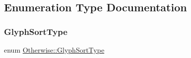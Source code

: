 \subsection{Enumeration Type Documentation}
\mbox{\label{namespace_otherwise_aa27b94bf7fe0e95dd17ed0a3506b12ee}} 
\subsubsection{\texorpdfstring{Glyph\+Sort\+Type}{GlyphSortType}}
{\footnotesize\ttfamily enum \hyperlink{namespace_otherwise_aa27b94bf7fe0e95dd17ed0a3506b12ee}{Otherwise\+::\+Glyph\+Sort\+Type}\hspace{0.3cm}{\ttfamily [strong]}}

